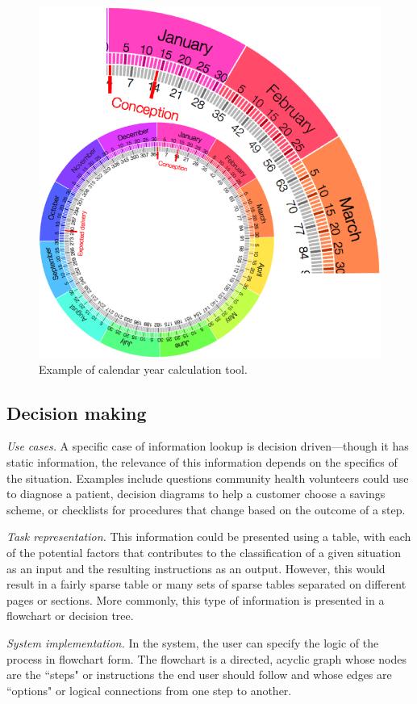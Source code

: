 \documentclass{sig-alternate}
\begin{document}
\begin{figure}
\centering
\includegraphics[width=.6\linewidth]{img/circletool.png}
\caption{Example of calendar year calculation tool.}
\label{fig:circletool}
\end{figure}

\subsection{Decision making}

\emph{Use cases.}
A specific case of information lookup is decision driven---though it has static information, the relevance of this information depends on the specifics of the situation. Examples include questions community health volunteers could use to diagnose a patient, decision diagrams to help a customer choose a savings scheme, or checklists for procedures that change based on the outcome of a step.

\emph{Task representation.}
This information could be presented using a table, with each of the potential factors that contributes to the classification of a given situation as an input and the resulting instructions as an output. However, this would result in a fairly sparse table or many sets of sparse tables separated on different pages or sections. More commonly, this type of information is presented in a flowchart or decision tree. 

\emph{System implementation.}
In the \nifty system, the user can specify the logic of the process in flowchart form. The flowchart is a directed, acyclic graph whose nodes are the ``steps" or instructions the end user should follow and whose edges are  ``options" or logical connections from one step to another.
\end{document}
